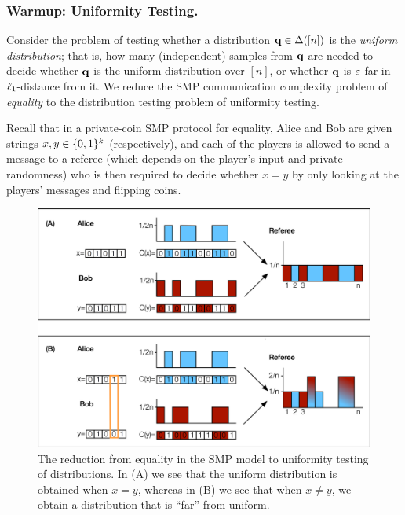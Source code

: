 \subsubsection{Warmup: Uniformity Testing.} 
\label{sec:uniformity_overview}
Consider the problem of testing whether a distribution $\q\in\distribs{[n]}$ is the \emph{uniform distribution}; that is, how many (independent) samples from $\q$ are needed to decide whether $\q$ is the uniform distribution over $[n]$, or whether $\q$ is $\eps$-far in $\lp[1]$-distance from it. We reduce the SMP communication complexity problem of \emph{equality} to the distribution testing problem of uniformity testing.

 Recall that in a private-coin SMP protocol for equality, Alice and Bob are given strings $x,y \in \bitset^k$ (respectively), and each of the players is allowed to send a message to a referee (which depends on the player's input and private randomness) who is then required to decide whether $x=y$ by only looking at the players' messages and flipping coins.
 
 \begin{figure}[ht!]
  \centering
  \includegraphics[scale=0.8]{chapter2/img_uniformity.png}
  \caption{{The reduction from equality in the SMP model to uniformity testing of distributions.} In (A) we see that the uniform distribution is obtained when $x=y$, whereas in (B) we see that when $x \neq y$, we obtain a distribution that is ``far'' from uniform.}
  \label{fig:uniformity}
\end{figure}

